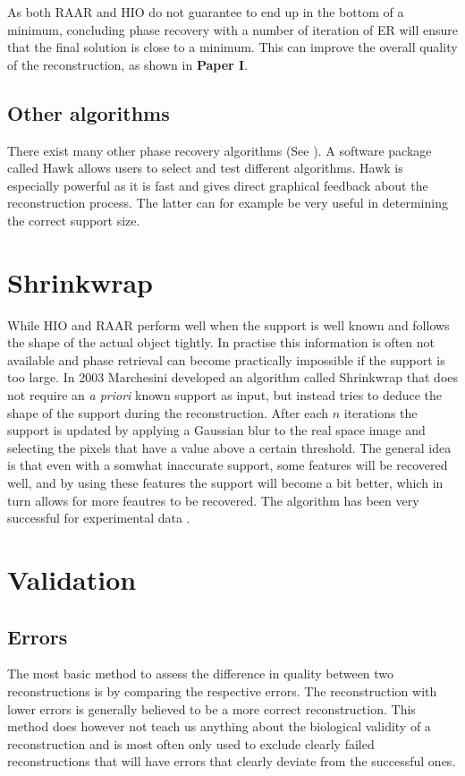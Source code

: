 As both RAAR and HIO do not guarantee to end up in the bottom of a minimum, concluding phase recovery with a number of iteration of ER will ensure that the final solution is close to a minimum. This can improve the overall quality of the reconstruction, as shown in \textbf{Paper I}.

\subsection{Other algorithms}
There exist many other phase recovery algorithms (See \cite{Marchesini2007a}). A software package called Hawk \cite{Maia2010} allows users to select and test different algorithms. Hawk is especially powerful as it is fast and gives direct graphical feedback about the reconstruction process. The latter can for example be very useful in determining the correct support size. 

\section{Shrinkwrap}
While HIO and RAAR perform well when the support is well known and follows the shape of the actual object tightly. In practise this information is often not available and phase retrieval can become practically impossible if the support is too large. In 2003 Marchesini developed an algorithm called Shrinkwrap \cite{Marchesini2003} that does not require an \textit{a priori} known support as input, but instead tries to deduce the shape of the support during the reconstruction. After each $n$ iterations the support is updated by applying a Gaussian blur to the real space image and selecting the pixels that have a value above a certain threshold. The general idea is that even with a somwhat inaccurate support, some features will be recovered well, and by using these features the support will become a bit better, which in turn allows for more feautres to be recovered. The algorithm has been very successful for experimental data \cite{Seibert2011}.

\section{Validation}

\subsection{Errors}
The most basic method to assess the difference in quality between two reconstructions is by comparing the respective errors. The reconstruction with lower errors is generally believed to be a more correct reconstruction. This method does however not teach us anything about the biological validity of a reconstruction and is most often only used to exclude clearly failed reconstructions that will have errors that clearly deviate from the successful ones.
 
